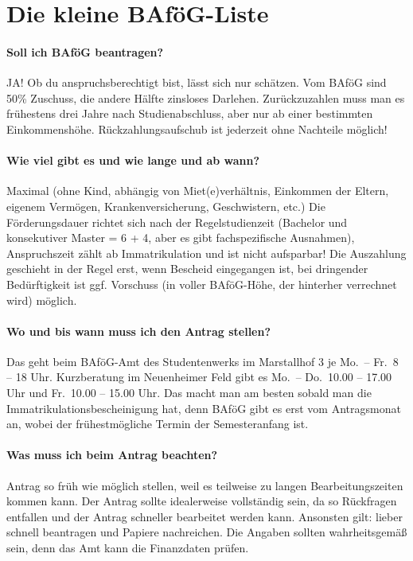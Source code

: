 \section{Die kleine BAföG-Liste}

\paragraph{Soll ich BAföG beantragen?}
JA! Ob du anspruchsberechtigt bist, lässt sich nur schätzen. Vom BAföG sind 50\% Zuschuss, die andere Hälfte zinsloses Darlehen. Zurückzuzahlen muss man es frühestens drei Jahre nach Studienabschluss, aber nur ab einer bestimmten Einkommenshöhe. Rückzahlungsaufschub ist jederzeit ohne Nachteile möglich!

\paragraph{Wie viel gibt es und wie lange und ab wann?}
Maximal  (ohne Kind, abhängig von Miet(e)verhältnis, Einkommen der Eltern, eigenem Vermögen, Krankenversicherung, Geschwistern, etc.) Die Förderungsdauer richtet sich nach der Regelstudienzeit (Bachelor und konsekutiver Master = 6 + 4, aber es gibt fachspezifische Ausnahmen), Anspruchszeit zählt ab Immatrikulation und ist nicht aufsparbar! Die Auszahlung geschieht in der Regel erst, wenn Bescheid eingegangen ist, bei dringender Bedürftigkeit ist ggf. Vorschuss (in voller BAföG-Höhe, der hinterher verrechnet wird) möglich.

\paragraph{Wo und bis wann muss ich den Antrag stellen?}
Das geht beim BAföG-Amt des Studentenwerks im Marstallhof 3 je Mo.\ -- Fr.\ 8 – 18 Uhr. Kurzberatung im Neuenheimer Feld gibt es Mo.\ – Do.\ 10.00 -- 17.00 Uhr und Fr.\ 10.00 -- 15.00 Uhr. Das macht man am besten sobald man die Immatrikulationsbescheinigung hat, denn BAföG gibt es erst vom Antragsmonat an, wobei der frühestmögliche Termin der Semesteranfang ist.

\paragraph{Was muss ich beim Antrag beachten?}
Antrag so früh wie möglich stellen, weil es teilweise zu langen Bearbeitungszeiten kommen kann. Der Antrag sollte idealerweise vollständig sein, da so Rückfragen entfallen und der Antrag schneller bearbeitet werden kann. Ansonsten gilt: lieber schnell beantragen und Papiere nachreichen. Die Angaben sollten wahrheitsgemäß sein, denn das Amt kann die Finanzdaten prüfen.

